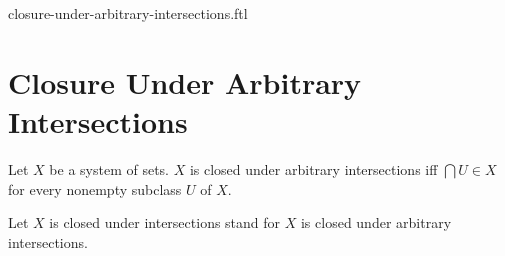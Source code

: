 \documentclass{naproche-library}
\begin{document}
\begin{smodule}{closure-under-arbitrary-intersections.ftl}

  \section*{Closure Under Arbitrary Intersections}

  \begin{definition}[forthel,id=FOUNDATIONS_14_2369621166391296]
    Let $X$ be a system of sets.
    $X$ is closed under arbitrary intersections iff $\bigcap U \in X$ for every nonempty subclass $U$ of $X$.

    Let $X$ is closed under intersections stand for $X$ is closed under arbitrary intersections.
  \end{definition}
\end{smodule}
\end{document}
